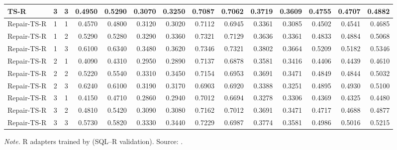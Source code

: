 {\begin{longtable}{@{}lccrrrrrrrrrrr@{}}
TS-R & 3 & 3 & 0.4950 & 0.5290 & 0.3070 & 0.3250 & 0.7087 & 0.7062 & 0.3719 & 0.3609 & 0.4755 & 0.4707 & 0.4882\\
\midrule
Repair-TS-R & 1 & 1 & 0.4570 & 0.4800 & 0.3120 & 0.3020 & 0.7112 & 0.6945 & 0.3361 & 0.3085 & 0.4502 & 0.4541 & 0.4685\\
Repair-TS-R & 1 & 2 & 0.5290 & 0.5280 & 0.3290 & 0.3360 & 0.7321 & 0.7129 & 0.3636 & 0.3361 & 0.4833 & 0.4884 & 0.5068\\
Repair-TS-R & 1 & 3 & 0.6100 & 0.6340 & 0.3480 & 0.3620 & 0.7346 & 0.7321 & 0.3802 & 0.3664 & 0.5209 & 0.5182 & 0.5346\\
Repair-TS-R & 2 & 1 & 0.4090 & 0.4310 & 0.2950 & 0.2890 & 0.7137 & 0.6878 & 0.3581 & 0.3416 & 0.4406 & 0.4439 & 0.4610\\
Repair-TS-R & 2 & 2 & 0.5220 & 0.5540 & 0.3310 & 0.3450 & 0.7154 & 0.6953 & 0.3691 & 0.3471 & 0.4849 & 0.4844 & 0.5032\\
Repair-TS-R & 2 & 3 & 0.6240 & 0.6100 & 0.3190 & 0.3170 & 0.6903 & 0.6920 & 0.3388 & 0.3251 & 0.4895 & 0.4930 & 0.5100\\
Repair-TS-R & 3 & 1 & 0.4150 & 0.4710 & 0.2860 & 0.2940 & 0.7012 & 0.6694 & 0.3278 & 0.3306 & 0.4369 & 0.4325 & 0.4480\\
Repair-TS-R & 3 & 2 & 0.4810 & 0.5420 & 0.3090 & 0.3080 & 0.7162 & 0.7012 & 0.3691 & 0.3471 & 0.4717 & 0.4688 & 0.4877\\
Repair-TS-R & 3 & 3 & 0.5730 & 0.5820 & 0.3330 & 0.3440 & 0.7229 & 0.6987 & 0.3774 & 0.3581 & 0.4986 & 0.5016 & 0.5215\\
\end{longtable}
}
\vspace{-0.6\baselineskip}
{\footnotesize\color{slate}\textit{Note.} R adapters trained by  (SQL--R validation). Source: .\par}
\medskip
